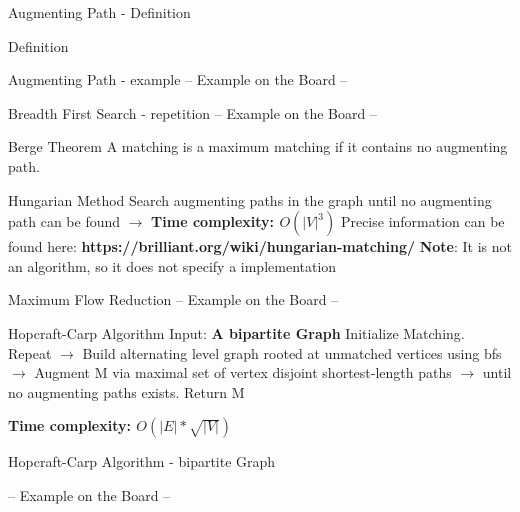 \begin{frame}{Augmenting Path - Definition}
\begin{block}{Definition}
\end{block} 
\end{frame}

\begin{frame}{Augmenting Path - example}
-- Example on the Board --
  
\end{frame}

\begin{frame}{Breadth First Search - repetition}
-- Example on the Board --
  
\end{frame}

\begin{frame}{Berge Theorem}
A matching is a maximum matching if it contains no augmenting path.
  
\end{frame}

\begin{frame}{Hungarian Method}
Search augmenting paths in the graph until no augmenting path can be found\newline
\newline
$\rightarrow$ \textbf {Time complexity: $O(|V|^3)$}\newline
\newline
Precise information can be found here: \textbf {https://brilliant.org/wiki/hungarian-matching/}\newline
\newline
\textbf {Note}: It is not an algorithm, so it does not specify a implementation
\end{frame}

\begin{frame}{Maximum Flow Reduction}
-- Example on the Board --
  
\end{frame}

\begin{frame}{Hopcraft-Carp Algorithm}
Input: \textbf{A bipartite Graph}
Initialize Matching. Repeat\newline
$\rightarrow$ Build alternating level graph rooted at unmatched vertices using bfs\newline
$\rightarrow$ Augment M via maximal set of vertex disjoint shortest-length paths\newline
$\rightarrow$ until no augmenting paths exists. Return M\newline
		
\textbf {Time complexity: $O(|E|*\sqrt{|V|})$}
  
\end{frame}

\begin{frame}{Hopcraft-Carp Algorithm - bipartite Graph}

-- Example on the Board --
  
\end{frame}

